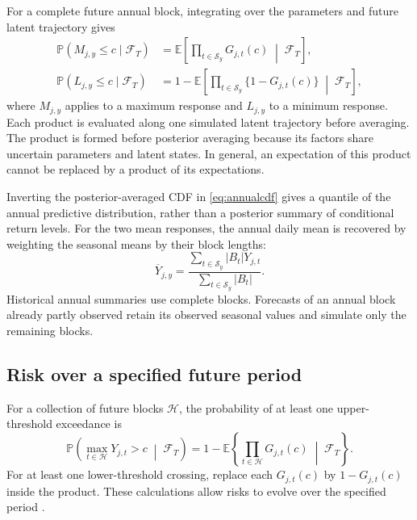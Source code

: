 \documentclass[11pt,a4paper]{article}
\newcommand{\E}{\mathbb E}
\newcommand{\Prb}{\mathbb P}
\begin{document}
	For a complete future annual block, integrating over the parameters
	and future latent trajectory gives
	\begin{equation}\label{eq:annualcdf}
		\begin{aligned}
			\Prb(M_{j,y}\le c\mid\mathcal F_T)
			&=\E\!\left[
			\prod_{t\in\mathcal S_y}G_{j,t}(c)
			\;\middle|\;\mathcal F_T\right],\\
			\Prb(L_{j,y}\le c\mid\mathcal F_T)
			&=1-\E\!\left[
			\prod_{t\in\mathcal S_y}\{1-G_{j,t}(c)\}
			\;\middle|\;\mathcal F_T\right],
		\end{aligned}
	\end{equation}
	where \(M_{j,y}\) applies to a maximum response and \(L_{j,y}\)
	to a minimum response. Each product is evaluated along one simulated
	latent trajectory before averaging. The product is formed before posterior averaging because its factors
	share uncertain parameters and latent states. In general, an expectation
	of this product cannot be replaced by a product of its expectations.
	
	Inverting the posterior-averaged CDF in \cref{eq:annualcdf} gives a
	quantile of the annual predictive distribution, rather than a
	posterior summary of conditional return levels.
	For the two mean responses, the annual daily mean is recovered by
	weighting the seasonal means by their block lengths:
	\begin{equation}\label{eq:supp-annual-mean}
		\overline Y_{j,y}
		=\frac{\sum_{t\in\mathcal S_y}|B_t|Y_{j,t}}
		{\sum_{t\in\mathcal S_y}|B_t|}.
	\end{equation}
	Historical annual summaries use complete blocks. Forecasts of an
	annual block already partly observed retain its observed seasonal
	values and simulate only the remaining blocks.
	
	\subsection{Risk over a specified future period}
	
	For a collection of future blocks \(\mathcal H\), the probability
	of at least one upper-threshold exceedance is
	\begin{equation}\label{eq:future-horizon-risk}
		\Prb\!\left(
		\max_{t\in\mathcal H}Y_{j,t}>c
		\;\middle|\;\mathcal F_T
		\right)
		=1-\E\!\left\{
		\prod_{t\in\mathcal H}G_{j,t}(c)
		\;\middle|\;\mathcal F_T
		\right\}.
	\end{equation}
	For at least one lower-threshold crossing, replace each
	\(G_{j,t}(c)\) by \(1-G_{j,t}(c)\) inside the product.
	These calculations allow risks to evolve over the specified period
	\citep{rootzen2013}.
	
\end{document}
